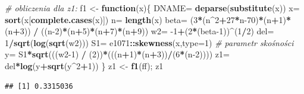 \documentclass[polish,]{book}
\newenvironment{Shaded}{\begin{snugshade}}{\end{snugshade}}
\newcommand{\CommentTok}[1]{\textcolor[rgb]{0.56,0.35,0.01}{\textit{#1}}}
\newcommand{\ControlFlowTok}[1]{\textcolor[rgb]{0.13,0.29,0.53}{\textbf{#1}}}
\newcommand{\DataTypeTok}[1]{\textcolor[rgb]{0.13,0.29,0.53}{#1}}
\newcommand{\DecValTok}[1]{\textcolor[rgb]{0.00,0.00,0.81}{#1}}
\newcommand{\KeywordTok}[1]{\textcolor[rgb]{0.13,0.29,0.53}{\textbf{#1}}}
\newcommand{\NormalTok}[1]{#1}
\newcommand{\OperatorTok}[1]{\textcolor[rgb]{0.81,0.36,0.00}{\textbf{#1}}}
\newcommand{\StringTok}[1]{\textcolor[rgb]{0.31,0.60,0.02}{#1}}
\begin{document}
\begin{Shaded}
\begin{Highlighting}[]
\CommentTok{# obliczenia dla z1:}
\NormalTok{f1 <-}\StringTok{ }\ControlFlowTok{function}\NormalTok{(x)\{}
\NormalTok{  DNAME=}\StringTok{ }\KeywordTok{deparse}\NormalTok{(}\KeywordTok{substitute}\NormalTok{(x))}
\NormalTok{  x=}\StringTok{ }\KeywordTok{sort}\NormalTok{(x[}\KeywordTok{complete.cases}\NormalTok{(x)])}
\NormalTok{  n=}\StringTok{ }\KeywordTok{length}\NormalTok{(x)}
\NormalTok{  beta=}\StringTok{ }\NormalTok{(}\DecValTok{3}\OperatorTok{*}\NormalTok{(n}\OperatorTok{^}\DecValTok{2}\OperatorTok{+}\DecValTok{27}\OperatorTok{*}\NormalTok{n}\DecValTok{-70}\NormalTok{)}\OperatorTok{*}\NormalTok{(n}\OperatorTok{+}\DecValTok{1}\NormalTok{)}\OperatorTok{*}\NormalTok{(n}\OperatorTok{+}\DecValTok{3}\NormalTok{)) }\OperatorTok{/}\StringTok{ }\NormalTok{((n}\DecValTok{-2}\NormalTok{)}\OperatorTok{*}\NormalTok{(n}\OperatorTok{+}\DecValTok{5}\NormalTok{)}\OperatorTok{*}\NormalTok{(n}\OperatorTok{+}\DecValTok{7}\NormalTok{)}\OperatorTok{*}\NormalTok{(n}\OperatorTok{+}\DecValTok{9}\NormalTok{))}
\NormalTok{  w2=}\StringTok{ }\DecValTok{-1}\OperatorTok{+}\NormalTok{(}\DecValTok{2}\OperatorTok{*}\NormalTok{(beta}\DecValTok{-1}\NormalTok{))}\OperatorTok{^}\NormalTok{(}\DecValTok{1}\OperatorTok{/}\DecValTok{2}\NormalTok{)}
\NormalTok{  del=}\StringTok{ }\DecValTok{1}\OperatorTok{/}\KeywordTok{sqrt}\NormalTok{(}\KeywordTok{log}\NormalTok{(}\KeywordTok{sqrt}\NormalTok{(w2)))}
\NormalTok{  S1=}\StringTok{ }\NormalTok{e1071}\OperatorTok{::}\KeywordTok{skewness}\NormalTok{(x,}\DataTypeTok{type=}\DecValTok{1}\NormalTok{) }\CommentTok{# parametr skośności}
\NormalTok{  y=}\StringTok{ }\NormalTok{S1}\OperatorTok{*}\KeywordTok{sqrt}\NormalTok{(((w2}\DecValTok{-1}\NormalTok{) }\OperatorTok{/}\StringTok{ }\NormalTok{(}\DecValTok{2}\NormalTok{))}\OperatorTok{*}\NormalTok{(((n}\OperatorTok{+}\DecValTok{1}\NormalTok{)}\OperatorTok{*}\NormalTok{(n}\OperatorTok{+}\DecValTok{3}\NormalTok{))}\OperatorTok{/}\NormalTok{(}\DecValTok{6}\OperatorTok{*}\NormalTok{(n}\DecValTok{-2}\NormalTok{))))}
\NormalTok{  z1=}\StringTok{ }\NormalTok{del}\OperatorTok{*}\KeywordTok{log}\NormalTok{(y}\OperatorTok{+}\KeywordTok{sqrt}\NormalTok{(y}\OperatorTok{^}\DecValTok{2}\OperatorTok{+}\DecValTok{1}\NormalTok{))}
\NormalTok{  \}}
\NormalTok{z1 <-}\StringTok{ }\KeywordTok{f1}\NormalTok{(ff); z1}
\end{Highlighting}
\end{Shaded}

\begin{verbatim}
## [1] 0.3315036
\end{verbatim}
\end{document}
